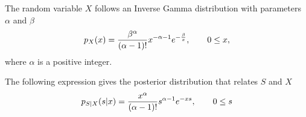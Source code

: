 \question[25] 

\ifspanish

\else

The random variable $X$ follows an Inverse Gamma distribution with parameters $\alpha$ and $\beta$
\begin{equation*}
p_{X}(x) = \frac{\beta^\alpha}{(\alpha -1)!}
      x^{-\alpha-1} e^{-\frac{\beta}{x}}, \qquad  0 \le x,
\end{equation*}
where $\alpha$ is a positive integer.

The following expression gives the posterior distribution that relates $S$ and $X$
\begin{equation*}
p_{S|X}(s|x) = \frac{x^{\alpha}}{(\alpha -1)!}s^{\alpha-1}e^{-x s}, \qquad 0 \le s
\end{equation*}

